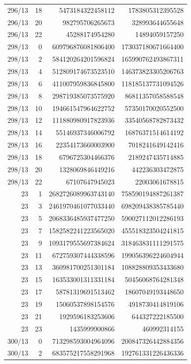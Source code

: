 \begin{longtable}{@{}rrrr@{}}
296/13 & 18 & 5473184322458112 & 1783805312395528\\
296/13 & 20 & 982795706265673 & 328993644655648\\
296/13 & 22 & 45288174954280 & 14894059157250\\
298/13 & 0 & 609796876081806400 & 173037180671664400\\
298/13 & 2 & 584120264201596824 & 165990762493867311\\
298/13 & 4 & 512809174673523510 & 146373823305206763\\
298/13 & 6 & 411007959836845800 & 118185137731094526\\
298/13 & 8 & 298719385073575920 & 86811357058588548\\
298/13 & 10 & 194661547964622752 & 57350170020552500\\
298/13 & 12 & 111880980917823936 & 33540568782873432\\
298/13 & 14 & 55146937346006792 & 16876371514614192\\
298/13 & 16 & 22354173660003900 & 7018241649142416\\
298/13 & 18 & 6796725304466376 & 2189247435714885\\
298/13 & 20 & 1328069846449216 & 442236303472875\\
298/13 & 22 & 67107647945023 & 22003061678815\\
23 & 1 & 2682726089963743140 & 758590194887261387\\
23 & 3 & 2461970461077033440 & 698209438385785440\\
23 & 5 & 2068336485937477250 & 590027112012286193\\
23 & 7 & 1582582241223565020 & 455518323504241815\\
23 & 9 & 1093179555697384624 & 318463831111291575\\
23 & 11 & 672759307444338596 & 199056396224604944\\
23 & 13 & 360981700251301184 & 108828809353433680\\
23 & 15 & 163533001311331184 & 50456068764281348\\
23 & 17 & 58781319691513462 & 18607049193448650\\
23 & 19 & 15060537898154576 & 4918730414819106\\
23 & 21 & 1929596183253606 & 644327222185500\\
23 & 23 & 1435999900866 & 460992314155\\
300/13 & 0 & 713298593004964096 & 200847326442884356\\
300/13 & 2 & 683575217558291968 & 192761331226436336\\

\end{longtable}
